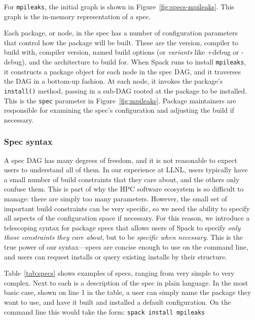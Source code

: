 For {\tt mpileaks}, 
the initial graph is shown in Figure~\ref{fig:specs-mpileaks}.  This graph is the in-memory
representation of a spec.

Each package, or node, in the spec has a number of configuration parameters that control
how the package will be built.  These are the version, compiler to build with, compiler version, 
named build options (or {\it variants} like +debug or -debug), and the architecture to
build for.  When Spack runs to install {\tt mpileaks}, it constructs a package object for each node
in the spec DAG, and it traverses the DAG in a bottom-up fashion.  At each node, it
invokes the package's {\tt install()} method, passing in a sub-DAG rooted at the
package to be installed.  This is the {\tt spec} parameter in Figure~\ref{fig:mpileaks}.
Package maintainers are responsible for examining the spec's configuration and adjusting the 
build if necessary.

\subsubsection{Spec syntax}
A spec DAG has many degrees of freedom, and it is not reasonable to expect users to
understand all of them.  In our experience at LLNL, users typically have a small number of 
build constraints that they care about, and the others only confuse them.  This is part of why
the HPC software ecosystem is so difficult to manage: there are simply too many parameters.
However, the small set of important build constraints can be very specific, so we need the
ability to specify all aspects of the configuration space if necessary.  For this reason, 
we introduce a telescoping syntax for package specs that allows users of Spack to
specify {\it only those constraints they care about}, but to be {\it specific when necessary}.
This is the true power of our syntax---specs are concise enough to use on the command line,
and users can request installs or query existing installs by their structure.

Table~\ref{tab:specs} shows examples of specs, ranging from very simple to very complex.
Next to each is a description of the spec in plain language.  In the most basic case,
shown on line 1 in the table, a user can simply name the package they want to use, and have it
built and installed a default configuration.  On the command line this would take the form:
\newline\newline
{\tt spack install mpileaks}
\newline

